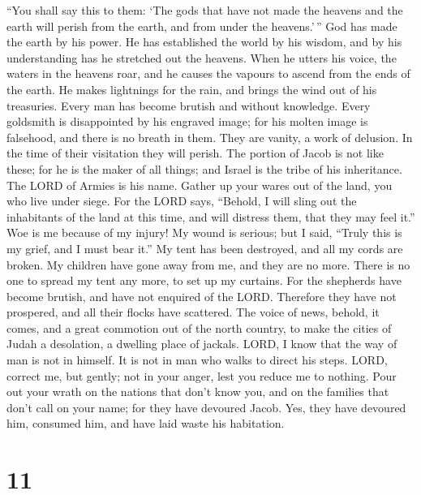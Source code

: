  ``You shall say this to them: `The gods that have not made
the heavens and the earth will perish from the earth, and from under the
heavens.'\,''  God has made the earth by his power. He has
established the world by his wisdom, and by his understanding has he
stretched out the heavens.  When he utters his voice, the
waters in the heavens roar, and he causes the vapours to ascend from the
ends of the earth. He makes lightnings for the rain, and brings the wind
out of his treasuries.  Every man has become brutish and
without knowledge. Every goldsmith is disappointed by his engraved
image; for his molten image is falsehood, and there is no breath in
them.  They are vanity, a work of delusion. In the time of
their visitation they will perish.  The portion of Jacob is
not like these; for he is the maker of all things; and Israel is the
tribe of his inheritance. The LORD of Armies is his name. 
Gather up your wares out of the land, you who live under siege.
 For the LORD says, ``Behold, I will sling out the
inhabitants of the land at this time, and will distress them, that they
may feel it.''  Woe is me because of my injury! My wound is
serious; but I said, ``Truly this is my grief, and I must bear it.''
 My tent has been destroyed, and all my cords are broken.
My children have gone away from me, and they are no more. There is no
one to spread my tent any more, to set up my curtains.  For
the shepherds have become brutish, and have not enquired of the LORD.
Therefore they have not prospered, and all their flocks have scattered.
 The voice of news, behold, it comes, and a great commotion
out of the north country, to make the cities of Judah a desolation, a
dwelling place of jackals.  LORD, I know that the way of
man is not in himself. It is not in man who walks to direct his steps.
 LORD, correct me, but gently; not in your anger, lest you
reduce me to nothing.  Pour out your wrath on the nations
that don't know you, and on the families that don't call on your name;
for they have devoured Jacob. Yes, they have devoured him, consumed him,
and have laid waste his habitation.

\hypertarget{section-10}{%
\section{11}\label{section-10}}

